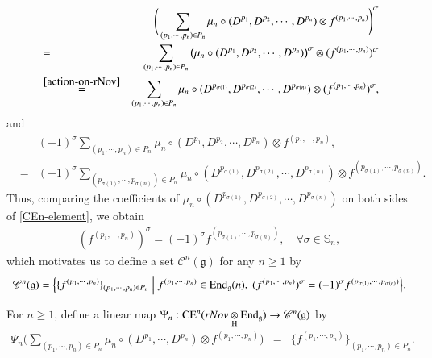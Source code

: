 \documentclass[12pt]{amsart}
\theoremstyle{definition}
\newcommand{\g}{\mathfrak g}
\newcommand{\End}{\mathrm{End}}
\newcommand{\ot}{\otimes}
\newcommand{\ce}{{\rm CE}}
\newcommand{\scrC}{{\mathscr{C}}}
\begin{document}
\begin{eqnarray*}\label{action-on-Had-prod}
&&\Bigg(\sum_{(p_1,\cdots,p_n)\in P_n} \mu_n\circ(D^{p_1},D^{p_2},\cdots,D^{p_n})\otimes f^{(p_1,\cdots,p_n)}\Bigg)^\sigma\\
&=&\sum_{(p_1,\cdots,p_n)\in P_n} \big(\mu_n\circ(D^{p_1},D^{p_2},\cdots,D^{p_n})\big)^\sigma\otimes (f^{(p_1,\cdots,p_n)})^\sigma\nonumber\\
&\overset{\eqref{action-on-rNov}}=&\sum_{(p_1,\cdots,p_n)\in P_n} \mu_n\circ(D^{p_{\sigma(1)}},D^{p_{\sigma(2)}},\cdots,D^{p_{\sigma(n)}})\otimes (f^{(p_1,\cdots,p_n)})^\sigma,\nonumber
\end{eqnarray*}
and
\begin{eqnarray*}
&&(-1)^\sigma\sum_{(p_1,\cdots,p_n)\in P_n} \mu_n\circ(D^{p_1},D^{p_2},\cdots,D^{p_n} )\otimes f^{(p_1,\cdots,p_n)},\\
&=&(-1)^\sigma\sum_{(p_{\sigma(1)},\cdots,p_{\sigma(n)})\in P_n} \mu_n\circ(D^{p_{\sigma(1)}},D^{p_{\sigma(2)}},\cdots,D^{p_{\sigma(n)}} )\otimes f^{(p_{\sigma(1)},\cdots,p_{\sigma(n)})}\nonumber.
\end{eqnarray*}
Thus, comparing the coefficients of $\mu_n\circ(D^{p_{\sigma(1)}},D^{p_{\sigma(2)}},\cdots,D^{p_{\sigma(n)}})$ on both sides of \eqref{CEn-element}, we obtain
\begin{eqnarray}\label{def-of-scrCn-action}
(f^{(p_1,\cdots,p_n)})^\sigma=(-1)^\sigma f^{(p_{\sigma(1)},\cdots,p_{\sigma(n)})},\quad\forall\sigma\in\mathbb{S}_n,
\end{eqnarray}
which motivates us to define a set $\scrC^n(\g)$ for any $n\geq 1$ by
\begin{eqnarray*}
\scrC^n(\g)=\Bigl\{ \{f^{(p_1,\cdots,p_n)}\}_{(p_1,\cdots,p_n)\in P_n} \;\Big|\; f^{(p_1,\cdots,p_n)}\in\End_\g(n),\
(f^{(p_1,\cdots,p_n)})^\sigma=(-1)^\sigma f^{(p_{\sigma(1)},\cdots,p_{\sigma(n)})} \Bigr\}.
\end{eqnarray*}
 

For $n\geq 1$, define a linear map $\Psi_n: \ce^n(rNov\underset{\rm H}{\ot}\End_\g) \to \scrC^n(\g)$ by
\begin{eqnarray*}
\Psi_n\Big(\sum_{(p_1,\cdots,p_n)\in P_n} \mu_n\circ(D^{p_1},\cdots,D^{p_n})\otimes f^{(p_1,\cdots,p_n)}\Big)&=&\{f^{(p_1,\cdots,p_n)}\}_{(p_1,\cdots,p_n)\in P_n}.
\end{eqnarray*}
\end{document}

